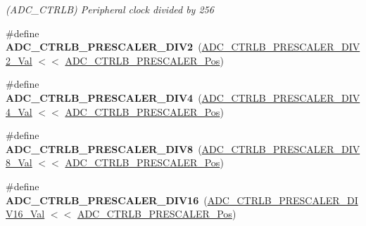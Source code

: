 \begin{DoxyCompactItemize}
\begin{DoxyCompactList}\small\item\em (A\+D\+C\+\_\+\+C\+T\+R\+L\+B) Peripheral clock divided by 256 \end{DoxyCompactList}\item 
\hypertarget{group___s_a_m_l21___a_d_c_gac63ef6ae6b1cb34ef2b10bb5cfbea13c}{}\#define {\bfseries A\+D\+C\+\_\+\+C\+T\+R\+L\+B\+\_\+\+P\+R\+E\+S\+C\+A\+L\+E\+R\+\_\+\+D\+I\+V2}~(\hyperlink{group___s_a_m_l21___a_d_c_gaf57a292b2555153261bdf72996215124}{A\+D\+C\+\_\+\+C\+T\+R\+L\+B\+\_\+\+P\+R\+E\+S\+C\+A\+L\+E\+R\+\_\+\+D\+I\+V2\+\_\+\+Val}  $<$$<$ \hyperlink{group___s_a_m_l21___a_d_c_ga67bbef18402c0d73dcc1698fa185ab76}{A\+D\+C\+\_\+\+C\+T\+R\+L\+B\+\_\+\+P\+R\+E\+S\+C\+A\+L\+E\+R\+\_\+\+Pos})\label{group___s_a_m_l21___a_d_c_gac63ef6ae6b1cb34ef2b10bb5cfbea13c}

\item 
\hypertarget{group___s_a_m_l21___a_d_c_ga914326a1bec32859ed4b60ad4125eaf6}{}\#define {\bfseries A\+D\+C\+\_\+\+C\+T\+R\+L\+B\+\_\+\+P\+R\+E\+S\+C\+A\+L\+E\+R\+\_\+\+D\+I\+V4}~(\hyperlink{group___s_a_m_l21___a_d_c_gaba2eeed7d542b9de1eb9a50e78acd772}{A\+D\+C\+\_\+\+C\+T\+R\+L\+B\+\_\+\+P\+R\+E\+S\+C\+A\+L\+E\+R\+\_\+\+D\+I\+V4\+\_\+\+Val}  $<$$<$ \hyperlink{group___s_a_m_l21___a_d_c_ga67bbef18402c0d73dcc1698fa185ab76}{A\+D\+C\+\_\+\+C\+T\+R\+L\+B\+\_\+\+P\+R\+E\+S\+C\+A\+L\+E\+R\+\_\+\+Pos})\label{group___s_a_m_l21___a_d_c_ga914326a1bec32859ed4b60ad4125eaf6}

\item 
\hypertarget{group___s_a_m_l21___a_d_c_ga640467abd39a47c30215bb2c0e0f7dec}{}\#define {\bfseries A\+D\+C\+\_\+\+C\+T\+R\+L\+B\+\_\+\+P\+R\+E\+S\+C\+A\+L\+E\+R\+\_\+\+D\+I\+V8}~(\hyperlink{group___s_a_m_l21___a_d_c_ga5c595885e48c5b30373553f9bc85c5e2}{A\+D\+C\+\_\+\+C\+T\+R\+L\+B\+\_\+\+P\+R\+E\+S\+C\+A\+L\+E\+R\+\_\+\+D\+I\+V8\+\_\+\+Val}  $<$$<$ \hyperlink{group___s_a_m_l21___a_d_c_ga67bbef18402c0d73dcc1698fa185ab76}{A\+D\+C\+\_\+\+C\+T\+R\+L\+B\+\_\+\+P\+R\+E\+S\+C\+A\+L\+E\+R\+\_\+\+Pos})\label{group___s_a_m_l21___a_d_c_ga640467abd39a47c30215bb2c0e0f7dec}

\item 
\hypertarget{group___s_a_m_l21___a_d_c_gae6148ec9386d90ae1a10aa1b0bfd37b8}{}\#define {\bfseries A\+D\+C\+\_\+\+C\+T\+R\+L\+B\+\_\+\+P\+R\+E\+S\+C\+A\+L\+E\+R\+\_\+\+D\+I\+V16}~(\hyperlink{group___s_a_m_l21___a_d_c_gae9c4228a9a26ca419668edabde055ca4}{A\+D\+C\+\_\+\+C\+T\+R\+L\+B\+\_\+\+P\+R\+E\+S\+C\+A\+L\+E\+R\+\_\+\+D\+I\+V16\+\_\+\+Val} $<$$<$ \hyperlink{group___s_a_m_l21___a_d_c_ga67bbef18402c0d73dcc1698fa185ab76}{A\+D\+C\+\_\+\+C\+T\+R\+L\+B\+\_\+\+P\+R\+E\+S\+C\+A\+L\+E\+R\+\_\+\+Pos})\label{group___s_a_m_l21___a_d_c_gae6148ec9386d90ae1a10aa1b0bfd37b8}


\end{DoxyCompactItemize}
